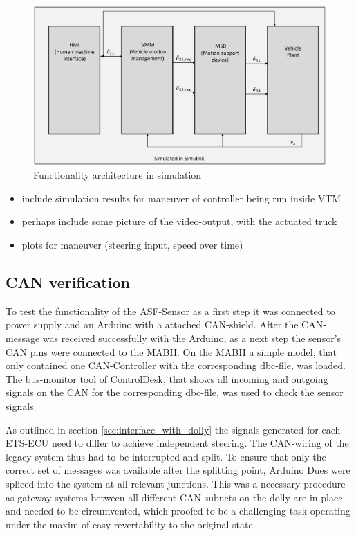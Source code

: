 \documentclass[ExampleMasters.tex]{subfiles}
\begin{document}
\begin{figure}[!htb]

	\centering
	\includegraphics[width=0.5\linewidth]{figures/functionality_architecture_sim}
	
	\caption{Functionality architecture in simulation}
	\label{fig:funct_architecture_sim}
\end{figure}

\begin{itemize}
	\item include simulation results for maneuver of controller being run inside \gls{VTM} 
	\item perhaps include some picture of the video-output, with the actuated truck
	\item plots for maneuver (steering input, speed over time)
	
\end{itemize}
\subsection{CAN verification}
To test the functionality of the \gls{ASF}-Sensor as a first step it was connected to power supply and an Arduino with a attached \gls{CAN}-shield. After the \gls{CAN}-message was received successfully with the Arduino, as a next step the sensor's \gls{CAN} pins were connected to the \gls{MABII}. On the \gls{MABII} a simple model, that only contained one \gls{CAN}-Controller with the corresponding dbc-file, was loaded. The bus-monitor tool of ControlDesk, that shows all incoming and outgoing signals on the \gls{CAN} for the corresponding dbc-file, was used to check the sensor signals. 

As outlined in section \ref{sec:interface_with_dolly} the signals generated for each \gls{ETS}-\gls{ECU} need to differ to achieve independent steering. The \gls{CAN}-wiring of the legacy system thus had to be interrupted and split. To ensure that only the correct set of messages was available after the splitting point, Arduino Dues were spliced into the system at all relevant junctions. This was a necessary procedure as gateway-systems between all different \gls{CAN}-subnets on the dolly are in place and needed to be circumvented, which proofed to be a challenging task operating under the maxim of easy revertability to the original state.
\end{document}
